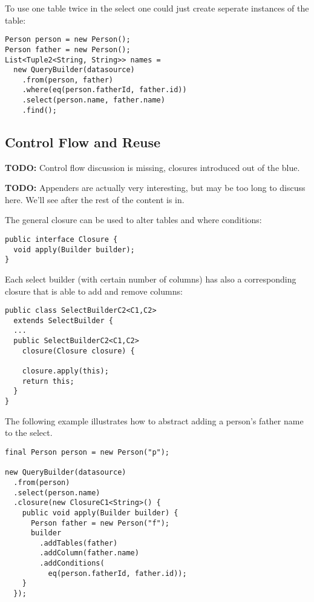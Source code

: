 \documentclass{sig-alternate}
\begin{document}
To use one table twice in the select one could just create seperate instances of the table:

\begin{verbatim}
Person person = new Person();
Person father = new Person();
List<Tuple2<String, String>> names = 
  new QueryBuilder(datasource)
    .from(person, father)
    .where(eq(person.fatherId, father.id))
    .select(person.name, father.name)
    .find();
\end{verbatim}

\subsection{Control Flow and Reuse}

\textbf{TODO:} Control flow discussion is missing, closures introduced out of the blue. 

\textbf{TODO:} Appenders are actually very interesting, but may be too long to discuss here. We'll see after the rest of the content is in.

The general closure can be used to alter tables and where conditions:

\begin{verbatim}
public interface Closure {
  void apply(Builder builder);
}
\end{verbatim}

Each select builder (with certain number of columns) has also a corresponding closure that is able to add and remove columns:

\begin{verbatim}
public class SelectBuilderC2<C1,C2> 
  extends SelectBuilder {
  ...
  public SelectBuilderC2<C1,C2> 
    closure(Closure closure) {

    closure.apply(this);
    return this;
  }
}
\end{verbatim}

The following example illustrates how to abstract adding a person's father name to the select.

\begin{verbatim}
final Person person = new Person("p");

new QueryBuilder(datasource)
  .from(person)
  .select(person.name)
  .closure(new ClosureC1<String>() {
    public void apply(Builder builder) {
      Person father = new Person("f");
      builder
        .addTables(father)
        .addColumn(father.name)
        .addConditions(
          eq(person.fatherId, father.id));
    }
  });
\end{verbatim}
\end{document}
